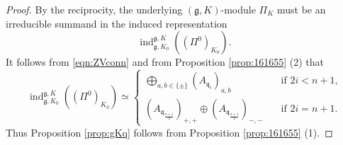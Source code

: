 \begin{proof}
By the reciprocity,
 the underlying $({\mathfrak{g}},K)$-module $\Pi_K$ must be an irreducible summand
 in the induced representation
\[
   {\operatorname{ind}}_{{\mathfrak{g}},K_0}^{{\mathfrak{g}},K}
   ((\Pi^0)_{K_0}).  
\]
It follows from \eqref{eqn:ZVconn}
 and from Proposition \ref{prop:161655} (2)
 that
\[
{\operatorname{ind}}_{{\mathfrak{g}},K_0}^{{\mathfrak{g}},K}
   ((\Pi^0)_{K_0})
\simeq
\begin{cases}
\underset {a, b \in \{\pm\}}{\bigoplus} (A_{\mathfrak{q}_i})_{a, b}
&\text{if $2i < n+1$,}
\\
(A_{{\mathfrak{q}}_{\frac{n+1}{2}}})_{+,+}
\oplus
(A_{\mathfrak{q}_{\frac{n+1}2}})_{-,-}
\quad 
&\text{if $2i=n+1$.}
\end{cases}
\]
Thus Proposition \ref{prop:gKq} follows from Proposition \ref{prop:161655} (1). \end{proof}




